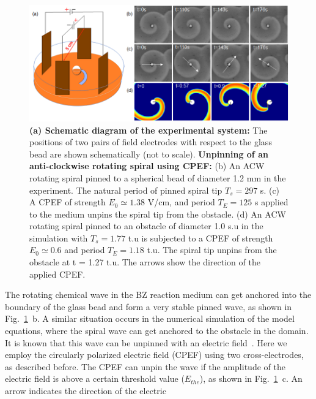 \begin{figure}[htb!]
    \centering
    \includegraphics[scale=0.7]{new_fig.png}
    \caption{\textbf{(a) Schematic diagram of the experimental system:} The
	positions of two pairs of field electrodes with respect to the glass
	bead are shown schematically (not to scale).  \textbf{Unpinning of an
	anti-clockwise rotating spiral using CPEF:}  (b) An ACW rotating spiral
	pinned to a spherical bead of diameter 1.2 mm in the experiment. The
	natural period of pinned spiral tip $T_{s} = 297 $ s. (c) A CPEF of
	strength $E_0 \simeq 1.38$ V/cm, and period $T_{E} = 125$ s applied to
	the medium unpins the spiral tip from the obstacle. 
    (d) An ACW rotating spiral pinned to an obstacle of diameter 1.0 s.u in the
	simulation with $T_{s} = 1.77$ t.u is subjected to a CPEF of strength
	$E_0 \simeq 0.6 $ and period $T_{E} =1.18$ t.u. The spiral tip unpins
	from the obstacle at t = 1.27 t.u.  The arrows show the direction of
	the applied CPEF.}
    \label{fig:unpinning_images}
\end{figure}
The rotating chemical wave in the BZ reaction medium can get anchored into the
boundary of the glass bead and form a very stable pinned wave, as shown in
Fig.~\ref{fig:unpinning_images}~b.  A similar situation occurs in the
numerical simulation of the model equations, where the spiral wave can get
anchored to the obstacle in the domain. It is known that this wave can be
unpinned with an electric field~\cite{Amrutha,???}. 
Here we employ the circularly polarized electric field (CPEF) using two
cross-electrodes, as described before. The CPEF can unpin the wave if the
amplitude of the electric field is above a certain threshold value ($E_{the}$),
as shown in Fig.~\ref{fig:unpinning_images}~c.  An arrow indicates the direction of the electric
